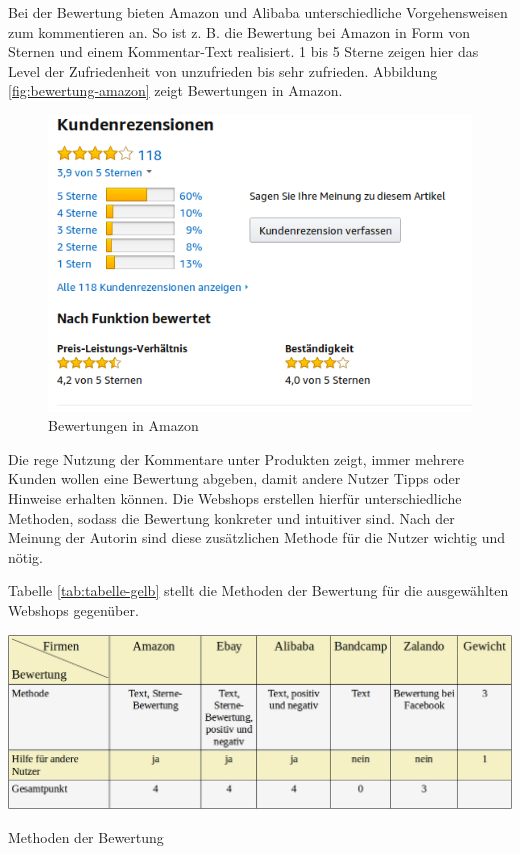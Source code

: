 Bei der Bewertung bieten Amazon und Alibaba unterschiedliche Vorgehensweisen zum kommentieren an. So ist z. B. die Bewertung bei Amazon in Form von Sternen und einem Kommentar-Text realisiert. 1 bis 5 Sterne zeigen hier das Level der Zufriedenheit von unzufrieden bis sehr zufrieden. Abbildung \vref{fig:bewertung-amazon} zeigt Bewertungen in Amazon.

\begin{figure}[htbp]
	\centering
	\includegraphics[width=1\textwidth]{bilder/bewertung-amazon.png}
	\caption{Bewertungen in Amazon}
	\label{fig:bewertung-amazon}
\end{figure}

Die rege Nutzung der Kommentare unter Produkten zeigt, immer mehrere Kunden wollen eine Bewertung abgeben, damit andere Nutzer Tipps oder Hinweise erhalten können. Die Webshops erstellen hierfür unterschiedliche Methoden, sodass die Bewertung konkreter und intuitiver sind. Nach der Meinung der Autorin sind diese zusätzlichen Methode für die Nutzer wichtig und nötig.

Tabelle \vref{tab:tabelle-gelb} stellt die Methoden der Bewertung für die ausgewählten Webshops gegenüber.

\begin{table}[htbp]
	\centering
	\includegraphics[width=1\textwidth]{bilder/tabelle-gelb.png}
	\caption{Methoden der Bewertung}
	\label{tab:tabelle-gelb}
\end{table}

